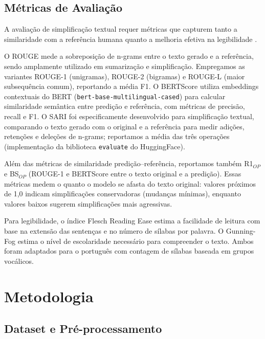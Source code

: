 \documentclass[a4paper, twocolumn, 11pt, twoside]{article}
\begin{document}
\subsection{Métricas de Avaliação}

A avaliação de simplificação textual requer métricas que capturem tanto a
similaridade com a referência humana quanto a melhoria efetiva na
legibilidade \citep{xu2016}.

O ROUGE \citep{lin2004} mede a sobreposição de n-grams entre o texto gerado
e a referência, sendo amplamente utilizado em sumarização e simplificação.
Empregamos as variantes ROUGE-1 (unigramas), ROUGE-2 (bigramas) e ROUGE-L
(maior subsequência comum), reportando a média F1. O BERTScore
\citep{zhang2020} utiliza embeddings contextuais do BERT
(\texttt{bert-base-multilingual-cased}) para calcular
similaridade semântica entre predição e referência, com métricas de
precisão, recall e F1. O SARI \citep{xu2016} foi especificamente
desenvolvido para simplificação textual, comparando o texto gerado com o
original e a referência para medir adições, retenções e deleções de
n-grams; reportamos a média das três operações (implementação da
biblioteca \texttt{evaluate} do HuggingFace).

Além das métricas de similaridade predição--referência, reportamos
também R1$_{OP}$ e BS$_{OP}$ (ROUGE-1 e BERTScore entre o texto
original e a predição). Essas métricas medem o quanto o modelo se
afasta do texto original: valores próximos de 1,0 indicam
simplificações conservadoras (mudanças mínimas), enquanto valores
baixos sugerem simplificações mais agressivas.

Para legibilidade, o índice Flesch Reading Ease \citep{flesch1948}
estima a facilidade de leitura com base na extensão das sentenças e no
número de sílabas por palavra. O Gunning-Fog \citep{gunning1952}
estima o nível de escolaridade necessário para compreender o texto.
Ambos foram adaptados para o português com contagem de sílabas
baseada em grupos vocálicos.

\section{Metodologia}

\subsection{Dataset e Pré-processamento}
\end{document}
